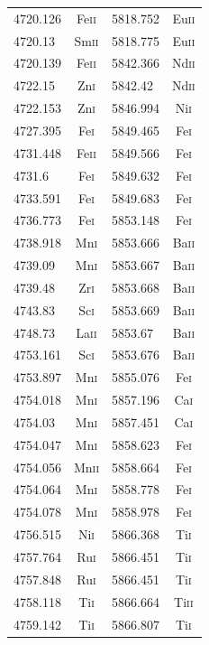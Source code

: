 \begin{longtable}[c]{|l|c|l|c|}
4720.126 & Fe\textsc{ii} & 5818.752 & Eu\textsc{ii}\\
4720.13 & Sm\textsc{ii} & 5818.775 & Eu\textsc{ii}\\ 
4720.139 & Fe\textsc{ii} & 5842.366 & Nd\textsc{ii}\\
4722.15 & Zn\textsc{i} & 5842.42 & Nd\textsc{ii}\\   
4722.153 & Zn\textsc{i} & 5846.994 & Ni\textsc{i}\\  
4727.395 & Fe\textsc{i} & 5849.465 & Fe\textsc{i}\\  
4731.448 & Fe\textsc{ii} & 5849.566 & Fe\textsc{i}\\ 
4731.6 & Fe\textsc{i} & 5849.632 & Fe\textsc{i}\\    
4733.591 & Fe\textsc{i} & 5849.683 & Fe\textsc{i}\\  
4736.773 & Fe\textsc{i} & 5853.148 & Fe\textsc{i}\\  
4738.918 & Mn\textsc{i} & 5853.666 & Ba\textsc{ii}\\ 
4739.09 & Mn\textsc{i} & 5853.667 & Ba\textsc{ii}\\  
4739.48 & Zr\textsc{i} & 5853.668 & Ba\textsc{ii}\\  
4743.83 & Sc\textsc{i} & 5853.669 & Ba\textsc{ii}\\  
4748.73 & La\textsc{ii} & 5853.67 & Ba\textsc{ii}\\  
4753.161 & Sc\textsc{i} & 5853.676 & Ba\textsc{ii}\\ 
4753.897 & Mn\textsc{i} & 5855.076 & Fe\textsc{i}\\  
4754.018 & Mn\textsc{i} & 5857.196 & Ca\textsc{i}\\  
4754.03 & Mn\textsc{i} & 5857.451 & Ca\textsc{i}\\   
4754.047 & Mn\textsc{i} & 5858.623 & Fe\textsc{i}\\  
4754.056 & Mn\textsc{ii} & 5858.664 & Fe\textsc{i}\\ 
4754.064 & Mn\textsc{i} & 5858.778 & Fe\textsc{i}\\  
4754.078 & Mn\textsc{i} & 5858.978 & Fe\textsc{i}\\  
4756.515 & Ni\textsc{i} & 5866.368 & Ti\textsc{i}\\  
4757.764 & Ru\textsc{i} & 5866.451 & Ti\textsc{i}\\  
4757.848 & Ru\textsc{i} & 5866.451 & Ti\textsc{i}\\  
4758.118 & Ti\textsc{i} & 5866.664 & Ti\textsc{ii}\\ 
4759.142 & Ti\textsc{i} & 5866.807 & Ti\textsc{i}\\  

\end{longtable}
